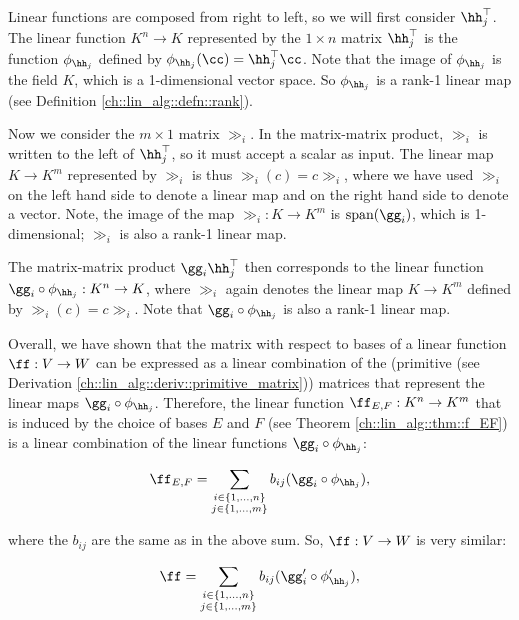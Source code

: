 Linear functions are composed from right to left, so we will first consider $\hh_j^\top$. The linear function $K^n \rightarrow K$ represented by the $1 \times n$ matrix $\hh_j^\top$ is the function $\phi_{\hh_j}$ defined by $\phi_{\hh_j}(\cc) = \hh_j^\top \cc$. Note that the image of $\phi_{\hh_j}$ is the field $K$, which is a 1-dimensional vector space. So $\phi_{\hh_j}$ is a rank-1 linear map (see Definition \ref{ch::lin_alg::defn::rank}).

Now we consider the $m \times 1$ matrix $\gg_i$. In the matrix-matrix product, $\gg_i$ is written to the left of $\hh_j^\top$, so it must accept a scalar as input. The linear map $K \rightarrow K^m$ represented by $\gg_i$ is thus $\gg_i(c) = c \gg_i$, where we have used $\gg_i$ on the left hand side to denote a linear map and on the right hand side to denote a vector. Note, the image of the map $\gg_i:K \rightarrow K^m$ is $\spann(\gg_i)$, which is 1-dimensional; $\gg_i$ is also a rank-1 linear map.

The matrix-matrix product $\gg_i \hh_j^\top$ then corresponds to the linear function $\gg_i \circ \phi_{\hh_j}:K^n \rightarrow K$, where $\gg_i$ again denotes the linear map $K \rightarrow K^m$ defined by $\gg_i(c) = c \gg_i$. Note that  $\gg_i \circ \phi_{\hh_j}$ is also a rank-1 linear map.

Overall, we have shown that the matrix with respect to bases of a linear function $\ff:V \rightarrow W$ can be expressed as a linear combination of the (primitive (see Derivation \ref{ch::lin_alg::deriv::primitive_matrix})) matrices that represent the linear maps $\gg_i \circ \phi_{\hh_j}$. Therefore, the linear function $\ff_{E,F}:K^n \rightarrow K^m$ that is induced by the choice of bases $E$ and $F$ (see Theorem \ref{ch::lin_alg::thm::f_EF}) is a linear combination of the linear functions $\gg_i \circ \phi_{\hh_j}$:

\begin{align*}
    \ff_{E, F} = \sum_{\substack{i \in \{1, ..., n\} \\ j \in \{1, ..., m\}}} b_{ij} (\gg_i \circ \phi_{\hh_j}),
\end{align*}

where the $b_{ij}$ are the same as in the above sum. So, $\ff:V \rightarrow W$ is very similar:

\begin{align*}
    \ff = \sum_{\substack{i \in \{1, ..., n\} \\ j \in \{1, ..., m\}}} b_{ij} (\gg_i' \circ \phi_{\hh_j}'),
\end{align*}


